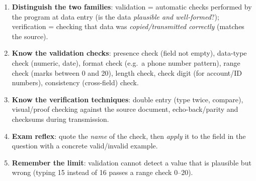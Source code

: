 \documentclass[11pt]{article}
\newcommand{\cle}[1]{{\popxbold\color{popdark}#1}}
\begin{document}
\begin{methode}
\begin{enumerate}
\item \textbf{Distinguish the two families}: \cle{validation} = automatic checks performed by the program at data entry (is the data \emph{plausible and well-formed}?); \cle{verification} = checking that data was \emph{copied/transmitted correctly} (matches the source).
\item \textbf{Know the validation checks}: presence check (field not empty), data-type check (numeric, date), format check (e.g.\ a phone number pattern), range check (marks between 0 and 20), length check, check digit (for account/ID numbers), consistency (cross-field) check.
\item \textbf{Know the verification techniques}: double entry (type twice, compare), visual/proof checking against the source document, echo-back/parity and checksums during transmission.
\item \textbf{Exam reflex}: quote the \emph{name} of the check, then \emph{apply} it to the field in the question with a concrete valid/invalid example.
\item \textbf{Remember the limit}: validation cannot detect a value that is plausible but wrong (typing 15 instead of 16 passes a range check $0$--$20$).
\end{enumerate}
\end{methode}
\end{document}
